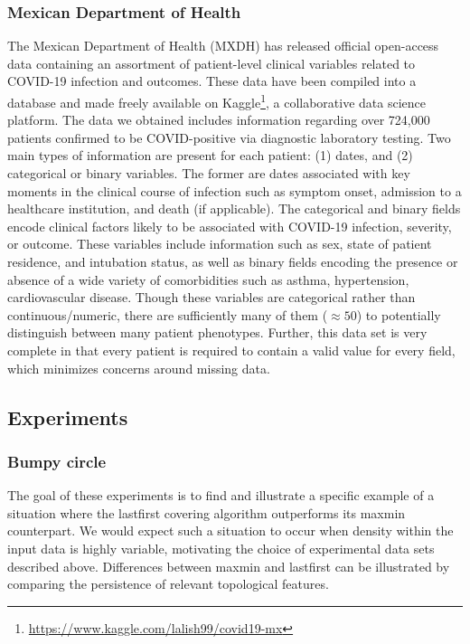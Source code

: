\documentclass{article}
\begin{document}
\hypertarget{mexican-department-of-health}{%
\subsubsection{Mexican Department of
Health}\label{mexican-department-of-health}}

The Mexican Department of Health (MXDH) has released official
open-access data containing an assortment of patient-level clinical
variables related to COVID-19 infection and outcomes. These data have
been compiled into a database and made freely available on
Kaggle\footnote{\url{https://www.kaggle.com/lalish99/covid19-mx}}, a
collaborative data science platform. The data we obtained includes
information regarding over 724,000 patients confirmed to be
COVID-positive via diagnostic laboratory testing. Two main types of
information are present for each patient: (1) dates, and (2) categorical
or binary variables. The former are dates associated with key moments in
the clinical course of infection such as symptom onset, admission to a
healthcare institution, and death (if applicable). The categorical and
binary fields encode clinical factors likely to be associated with
COVID-19 infection, severity, or outcome. These variables include
information such as sex, state of patient residence, and intubation
status, as well as binary fields encoding the presence or absence of a
wide variety of comorbidities such as asthma, hypertension,
cardiovascular disease. Though these variables are categorical rather
than continuous/numeric, there are sufficiently many of them
(\(\approx 50\)) to potentially distinguish between many patient
phenotypes. Further, this data set is very complete in that every
patient is required to contain a valid value for every field, which
minimizes concerns around missing data.

\hypertarget{experiments}{%
\subsection{Experiments}\label{experiments}}

\label{sec:experiments}

\hypertarget{bumpy-circle-1}{%
\subsubsection{Bumpy circle}\label{bumpy-circle-1}}

The goal of these experiments is to find and illustrate a specific
example of a situation where the lastfirst covering algorithm
outperforms its maxmin counterpart. We would expect such a situation to
occur when density within the input data is highly variable, motivating
the choice of experimental data sets described above. Differences
between maxmin and lastfirst can be illustrated by comparing the
persistence of relevant topological features.
\end{document}

